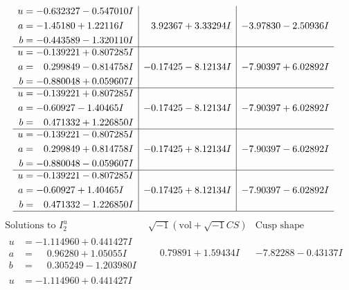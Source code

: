 \documentclass[1p]{elsarticle_modified}
\theoremstyle{definition}
\newcommand{\I}{\sqrt{-1}}
\begin{document}
$$\begin{array}{c|c|c}
\begin{aligned}
u &= -0.632327 - 0.547010 I \\
a &= -1.45180 + 1.22116 I \\
b &= -0.443589 - 1.320110 I\end{aligned}
 & \phantom{-}3.92367 + 3.33294 I & -3.97830 - 2.50936 I \\ \hline\begin{aligned}
u &= -0.139221 + 0.807285 I \\
a &= \phantom{-}0.299849 - 0.814758 I \\
b &= -0.880048 + 0.059607 I\end{aligned}
 & -0.17425 - 8.12134 I & -7.90397 + 6.02892 I \\ \hline\begin{aligned}
u &= -0.139221 + 0.807285 I \\
a &= -0.60927 - 1.40465 I \\
b &= \phantom{-}0.471332 + 1.226850 I\end{aligned}
 & -0.17425 - 8.12134 I & -7.90397 + 6.02892 I \\ \hline\begin{aligned}
u &= -0.139221 - 0.807285 I \\
a &= \phantom{-}0.299849 + 0.814758 I \\
b &= -0.880048 - 0.059607 I\end{aligned}
 & -0.17425 + 8.12134 I & -7.90397 - 6.02892 I \\ \hline\begin{aligned}
u &= -0.139221 - 0.807285 I \\
a &= -0.60927 + 1.40465 I \\
b &= \phantom{-}0.471332 - 1.226850 I\end{aligned}
 & -0.17425 + 8.12134 I & -7.90397 - 6.02892 I\\
 \hline 
 \end{array}$$\newpage$$\begin{array}{c|c|c}  
\text{Solutions to }I^u_{2}& \I (\text{vol} + \sqrt{-1}CS) & \text{Cusp shape}\\
 \hline 
\begin{aligned}
u &= -1.114960 + 0.441427 I \\
a &= \phantom{-}0.96280 + 1.05055 I \\
b &= \phantom{-}0.305249 - 1.203980 I\end{aligned}
 & \phantom{-}0.79891 + 1.59434 I & -7.82288 - 0.43137 I \\ \hline\begin{aligned}
u &= -1.114960 + 0.441427 I \\

\end{aligned}
\end{array}$$
\end{document}
